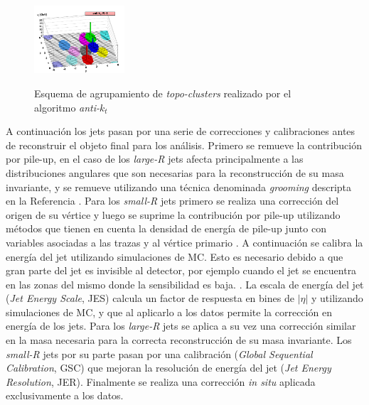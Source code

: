 \begin{figure}
\centering
\caption{Esquema de agrupamiento de \textit{topo-clusters} realizado por el algoritmo \textit{anti-$k_t$} }
  \includegraphics[width=0.3\textwidth]{images/antikt.png}
  \label{antikt}
\end{figure}

A continuación los jets pasan por una serie de correcciones y calibraciones antes de reconstruir el objeto final para los análisis. Primero se remueve la contribución por pile-up, en el caso de los \textit{large-R} jets afecta principalmente a las distribuciones angulares que son necesarias para la reconstrucción de su masa invariante, y se remueve utilizando una técnica denominada \textit{grooming} descripta en la Referencia \cite{trimming}. Para los \textit{small-R} jets primero se realiza una corrección del origen de su vértice y luego se suprime la contribución por pile-up utilizando métodos que tienen en cuenta la densidad de energía de pile-up \cite{PERF-2016-04} junto con variables asociadas a las trazas y al vértice primario \cite{PERF-2014-03} . A continuación se calibra la energía del jet utilizando simulaciones de MC. Esto es necesario debido a que gran parte del jet es invisible al detector, por ejemplo cuando el jet se encuentra en las zonas del mismo donde la sensibilidad es baja. . La escala de energía del jet (\textit{Jet Energy Scale}, JES) \cite{JETM-2018-05} calcula un factor de respuesta en bines de $|\eta|$ y \pt utilizando simulaciones de MC, y que al aplicarlo a los datos permite la corrección en energía de los jets. Para los \textit{large-R} jets se aplica a su vez una corrección similar en la masa necesaria para la correcta reconstrucción de su masa invariante. Los \textit{small-R} jets por su parte pasan por una calibración (\textit{Global Sequential Calibration}, GSC) que mejoran la resolución de energía del jet (\textit{Jet Energy Resolution}, JER). Finalmente se realiza una corrección \textit{in situ} aplicada exclusivamente a los datos.


